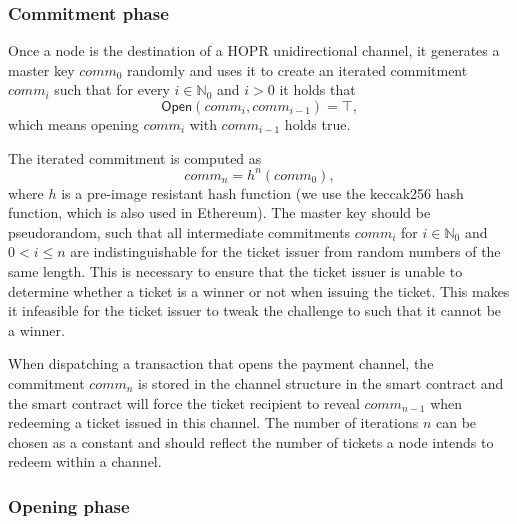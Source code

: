 \subsubsection{Commitment phase}

Once a node is the destination of a HOPR unidirectional channel, it generates a master key $comm_0$ randomly and uses it to create an iterated
commitment $comm_i$ such that for every $i \in \mathbb{N}_0$ and $i > 0$ it
holds that $$ \mathsf{Open}(comm_{i}, comm_{i-1}) = \top,$$ which means opening
$comm_{i}$ with $comm_{i-1}$ holds true.

The iterated commitment is computed as $$comm_n = h^n(comm_0),$$ where $h$ is a
pre-image resistant hash function (we use the keccak256 hash function, which is also used
in Ethereum).
The master key should be pseudorandom, such that
all intermediate commitments $comm_{i}$ for $i \in \mathbb{N}_0$ and $0 < i \le
n$ are indistinguishable for the ticket issuer from random numbers of the same
length. This is necessary to ensure that the ticket issuer is unable to
determine whether a ticket is a winner or not when issuing the ticket. This makes
it infeasible for the ticket issuer to tweak the challenge to such that it
cannot be a winner.

When dispatching a transaction that opens the payment channel, the
commitment $comm_n$ is stored in the channel structure in the smart contract and
the smart contract will force the ticket recipient to reveal $comm_{n-1}$ when
redeeming a ticket issued in this channel. The number of iterations $n$ can be
chosen as a constant and should reflect the number of tickets a node intends to
redeem within a channel.

\subsubsection{Opening phase}

